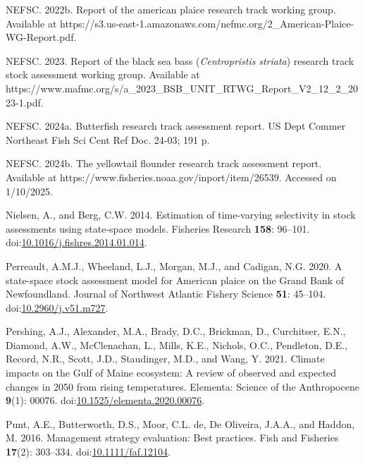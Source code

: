 \documentclass[
]{article}
\newlength{\cslhangindent}
\newlength{\cslentryspacingunit} %
\newenvironment{CSLReferences}[2] %
 {%
  \setlength{\parindent}{0pt}
  \ifodd #1
  \let\oldpar\par
  \def\par{\hangindent=\cslhangindent\oldpar}
  \fi
  \setlength{\parskip}{#2\cslentryspacingunit}
 }%
 {}
\begin{document}
\begin{CSLReferences}{1}{0}
\leavevmode{}%
NEFSC. 2022b. Report of the american plaice research track working group. {Available} at https://s3.us-east-1.amazonaws.com/nefmc.org/2\_American-Plaice-WG-Report.pdf.

\leavevmode{}%
NEFSC. 2023. Report of the black sea bass (\emph{{C}entropristis} \emph{striata}) research track stock assessment working group. {Available} at https://www.mafmc.org/s/a\_2023\_BSB\_UNIT\_RTWG\_Report\_V2\_12\_2\_2023-1.pdf.

\leavevmode{}%
NEFSC. 2024a. Butterfish research track assessment report. US Dept Commer Northeast Fish Sci Cent Ref Doc. 24-03; 191 p.

\leavevmode{}%
NEFSC. 2024b. The yellowtail flounder research track assessment report. {Available} at https://www.fisheries.noaa.gov/inport/item/26539. Accessed on 1/10/2025.

\leavevmode{}%
Nielsen, A., and Berg, C.W. 2014. Estimation of time-varying selectivity in stock assessments using state-space models. Fisheries Research \textbf{158}: 96--101. doi:\href{https://doi.org/10.1016/j.fishres.2014.01.014}{10.1016/j.fishres.2014.01.014}.

\leavevmode{}%
Perreault, A.M.J., Wheeland, L.J., Morgan, M.J., and Cadigan, N.G. 2020. A state-space stock assessment model for {American} plaice on the {Grand} {Bank} of {Newfoundland}. Journal of Northwest Atlantic Fishery Science \textbf{51}: 45--104. doi:\href{https://doi.org/10.2960/j.v51.m727}{10.2960/j.v51.m727}.

\leavevmode{}%
Pershing, A.J., Alexander, M.A., Brady, D.C., Brickman, D., Curchitser, E.N., Diamond, A.W., McClenachan, L., Mills, K.E., Nichols, O.C., Pendleton, D.E., Record, N.R., Scott, J.D., Staudinger, M.D., and Wang, Y. 2021. Climate impacts on the {G}ulf of {M}aine ecosystem: A review of observed and expected changes in 2050 from rising temperatures. Elementa: Science of the Anthropocene \textbf{9}(1): 00076. doi:\href{https://doi.org/10.1525/elementa.2020.00076}{10.1525/elementa.2020.00076}.

\leavevmode{}%
Punt, A.E., Butterworth, D.S., Moor, C.L. de, De Oliveira, J.A.A., and Haddon, M. 2016. Management strategy evaluation: Best practices. Fish and Fisheries \textbf{17}(2): 303--334. doi:\href{https://doi.org/10.1111/faf.12104}{10.1111/faf.12104}.


\end{CSLReferences}
\end{document}
